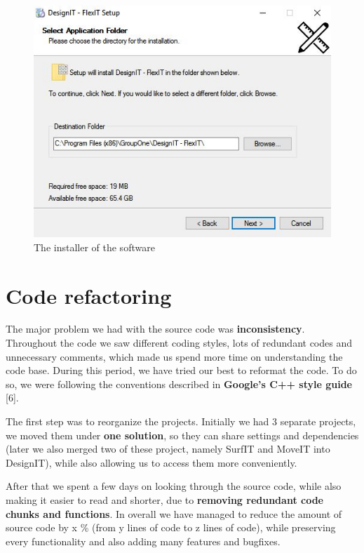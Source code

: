 \documentclass[a4paper, 11pt, article]{report}
\begin{document}
\begin{figure}[H]
\includegraphics[width=13cm]{images/setup}
\caption{The installer of the software}
\centering
\end{figure}

\section{Code refactoring}

The major problem we had with the source code was \textbf{inconsistency}. Throughout the code we saw different coding styles, lots of redundant codes and unnecessary comments, which made us spend more time on understanding the code base. During this period, we have tried our best to reformat the code. To do so, we were following the conventions described in \textbf{Google's C++ style guide} [6]. 

The first step was to reorganize the projects. Initially we had 3 separate projects, we moved them under \textbf{one solution}, so they can share settings and dependencies (later we also merged two of these project, namely SurfIT and MoveIT into DesignIT), while also allowing us to access them more conveniently.

After that we spent a few days on looking through the source code, while also making it easier to read and shorter, due to \textbf{removing redundant code chunks and functions}. In overall we have managed to reduce the amount of source code by x \% (from y lines of code to z lines of code), while preserving every functionality and also adding many features and bugfixes.
\end{document}
